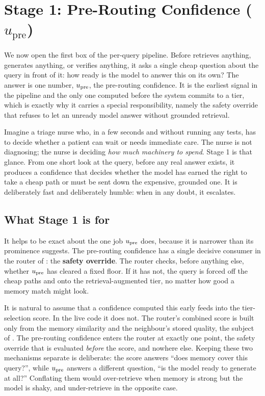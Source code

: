 \chapter{Stage 1: Pre-Routing Confidence ($u_{\text{pre}}$)}
\label{ch:upre}

We now open the first box of the per-query pipeline. Before \caem{} retrieves
anything, generates anything, or verifies anything, it asks a single cheap
question about the query in front of it: how ready is the model to answer this on
its own? The answer is one number, $u_{\text{pre}}$, the pre-routing confidence. It is the
earliest signal in the pipeline and the only one computed before the system
commits to a tier, which is exactly why it carries a special responsibility,
namely the safety override that refuses to let an unready model answer without
grounded retrieval.

\begin{intuition}
Imagine a triage nurse who, in a few seconds and without running any tests, has to
decide whether a patient can wait or needs immediate care. The nurse is not
diagnosing; the nurse is deciding \emph{how much machinery to spend}. Stage 1 is
that glance. From one short look at the query, before any real answer exists, it
produces a confidence that decides whether the model has earned the right to take
a cheap path or must be sent down the expensive, grounded one. It is deliberately
fast and deliberately humble: when in any doubt, it escalates.
\end{intuition}

\section{What Stage 1 is for}
\label{sec:upre-job}

It helps to be exact about the one job $u_{\text{pre}}$ does, because it is narrower than
its prominence suggests. The pre-routing confidence has a single decisive
consumer in the router of : the \textbf{safety override}. The
router checks, before anything else, whether $u_{\text{pre}}$ has cleared a fixed floor. If
it has not, the query is forced off the cheap paths and onto the
retrieval-augmented tier, no matter how good a memory match might look.

\begin{pitfall}
It is natural to assume that a confidence computed this early feeds into the
tier-selection score. In the live code it does not. The router's combined score
is built only from the memory similarity and the neighbour's stored quality, the
subject of . The pre-routing confidence enters the router at
exactly one point, the safety override that is evaluated \emph{before} the score,
and nowhere else. Keeping these two mechanisms separate is deliberate: the score
answers ``does memory cover this query?'', while $u_{\text{pre}}$ answers a different
question, ``is the model ready to generate at all?'' Conflating them would
over-retrieve when memory is strong but the model is shaky, and under-retrieve in
the opposite case.
\end{pitfall}

